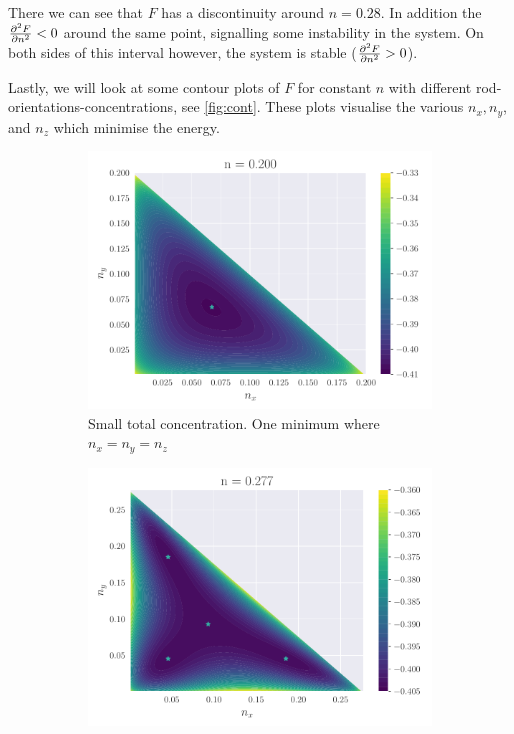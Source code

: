     There we can see that $F$ has a discontinuity around $n = 0.28$. In addition the $\pdv{^2F}{n^2} < 0$ around the same point, signalling some instability in the system. On both sides of this interval however, the system is stable ($\pdv{^2F}{n^2} > 0$). 
    
    Lastly, we will look at some contour plots of $F$ for constant $n$ with different rod-orientations-concentrations, see \cref{fig:cont}. These plots visualise the various $n_x, n_y$, and $n_z$ which minimise the energy. 
    \begin{figure}
        \centering
        \begin{subfigure}[b]{0.49\textwidth}
            \includegraphics[width=\textwidth]{./figs/contour_nan_0.2.pdf}
            \caption{Small total concentration. One minimum where $n_x = n_y = n_z$}
        \end{subfigure}
        \begin{subfigure}[b]{0.49\textwidth}
            \includegraphics[width=\textwidth]{./figs/contour_nan_0.2773.pdf}

\end{subfigure}
\end{figure}
